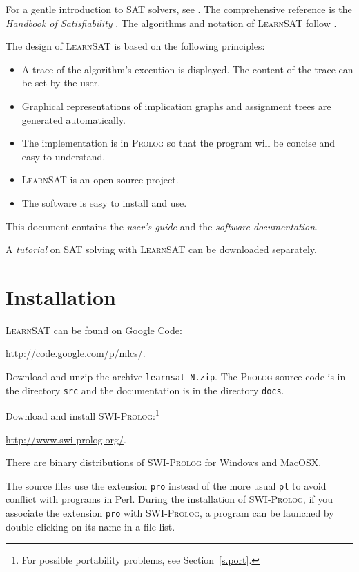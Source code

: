 \documentclass[11pt]{article}
\newcommand*{\p}[1]{\textup{\texttt{#1}}}
\newcommand*{\ls}{\textsc{LearnSAT}}
\newcommand*{\pl}{\textsc{Prolog}}
\newcommand*{\sw}{\textsc{SWI-Prolog}}
\begin{document}
For a gentle introduction to SAT solvers, see \cite[Chapter~6]{mlcs}.
The comprehensive reference is the \emph{Handbook of Satisfiability}
\cite{SAT}. The algorithms and notation of \ls{} follow \cite{mlm}.

The design of \ls{} is based on the following principles:

\begin{itemize}

\item A trace of the algorithm's execution is
displayed. The content of the trace can be set by the user.

\item Graphical representations of implication graphs and assignment
trees are generated automatically.

\item The implementation is in \pl{} so that the program will be concise
and easy to understand.

\item \ls{} is an open-source project.

\item The software is easy to install and use.
\end{itemize}

This document contains the \emph{user's guide} and the \emph{software
documentation}.

A \emph{tutorial} on SAT solving with \ls{} can be downloaded separately.

\section{Installation}

\ls{} can be found on Google Code:
\begin{center}
\url{http://code.google.com/p/mlcs/}.
\end{center}

Download and unzip the archive \p{learnsat-N.zip}. The \pl{} source code
is in the directory \p{src} and the documentation is in the directory
\p{docs}.

Download and install \sw{}:\footnote{For possible portability problems,
see Section~\ref{s.port}.}
\begin{center}
\url{http://www.swi-prolog.org/}.
\end{center}
There are binary distributions of \sw{} for Windows and MacOSX.

The source files use the extension \p{pro} instead of the more usual
\p{pl} to avoid conflict with programs in Perl. During the installation
of \sw{}, if you associate the extension \p{pro} with \sw{}, a
program can be launched by double-clicking on its name in a file list. 
\end{document}
